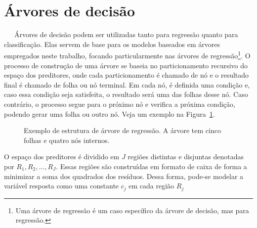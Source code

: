 \documentclass[
  12pt,
  a4paper,
]{scrreprt}
\begin{document}
\section{Árvores de decisão}\label{uxe1rvores-de-decisuxe3o}

~~~Árvores de decisão podem ser utilizadas tanto para regressão quanto
para classificação. Elas servem de base para os modelos baseados em
árvores empregados neste trabalho, focando particularmente nas árvores
de regressão\footnote{Uma árvore de regressão é um caso específico da
  árvore de decisão, mas para regressão.}. O processo de construção de
uma árvore se baseia no particionamento recursivo do espaço dos
preditores, onde cada particionamento é chamado de nó e o resultado
final é chamado de folha ou nó terminal. Em cada nó, é definida uma
condição e, caso essa condição seja satisfeita, o resultado será uma das
folhas desse nó. Caso contrário, o processo segue para o próximo nó e
verifica a próxima condição, podendo gerar uma folha ou outro nó. Veja
um exemplo na Figura~\ref{fig-arvore}.

\begin{figure}


\caption{\label{fig-arvore}Exemplo de estrutura de árvore de regressão.
A árvore tem cinco folhas e quatro nós internos.}

\end{figure}%

\vspace{12pt}

O espaço dos preditores é dividido em \(J\) regiões distintas e
disjuntas denotadas por \(R_1, R_2, \dots, R_J\). Essas regiões são
construídas em formato de caixa de forma a minimizar a soma dos
quadrados dos resíduos. Dessa forma, pode-se modelar a variável resposta
como uma constante \(c_j\) em cada região \(R_j\)
\end{document}
